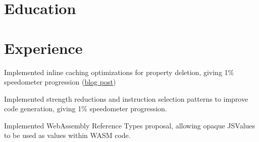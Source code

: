 \documentclass[12pt]{jmichaud-resume}
\begin{document}
\begin{minipage}[t]{5.4cm}
\vspace{65pt}

\section{Education} 




\end{minipage}
\hfill
\begin{minipage}[t]{11.5cm}
\section{Experience}


\hfill {}

\vspace{10pt}
\begin{tightemize}
	\item Implemented inline caching optimizations for property deletion, giving 1\% speedometer progression (\href{https://webkit.org/blog/10298/inline-caching-delete/}{\underline{blog post}})
	
\end{tightemize}
\sectionsepp
\hfill {}
\begin{tightemize}
	\item Implemented strength reductions and instruction selection patterns to improve code generation, giving 1\% speedometer progression.
	\item Implemented WebAssembly Reference Types proposal, allowing opaque JSValues to be used as values within WASM code.
	
\end{tightemize}
\sectionsep
{} \hfill {}


\end{minipage}
\end{document}
